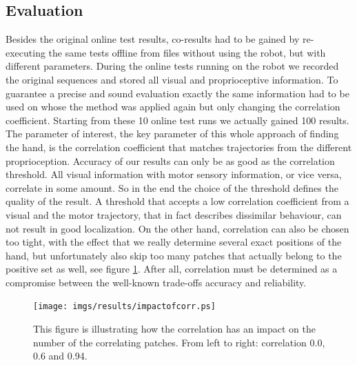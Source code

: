 \documentclass[conference]{IEEEtran}
\begin{document}
%
%
\subsection{Evaluation}\label{results:evaluation}
Besides the original online test results, co-results had to be gained by re-executing the same tests offline from files without using the robot, but with different parameters. During the online tests running on the robot we recorded the original sequences and stored all visual and proprioceptive information. To guarantee a precise and sound evaluation exactly the same information had to be used on whose the method was applied again but only changing the correlation coefficient. Starting from these 10 online test runs we actually gained 100 results. The parameter of interest, the key parameter of this whole approach of finding the hand, is the correlation coefficient that matches trajectories from the different proprioception. Accuracy of our results can only be as good as the correlation threshold. All visual information with motor sensory information, or vice versa, correlate in some amount. So in the end the choice of the threshold defines the quality of the result. A threshold that accepts a low correlation coefficient from a visual and the motor trajectory, that in fact describes dissimilar behaviour, can not result in good localization. On the other hand, correlation can also be chosen too tight, with the effect that we really determine several exact positions of the hand, but unfortunately also skip too many patches that actually belong to the positive set as well, see figure \ref{fig:impactofcorr}. After all, correlation must be determined as a compromise between the well-known trade-offs accuracy and reliability.
%
\begin{figure}
	\begin{center}
		\texttt{[image: imgs/results/impactofcorr.ps]}
			\caption[Varying the correlation threshold.]{ This figure is illustrating how the correlation has an impact on the number of the correlating patches. From left to right: correlation 0.0, 0.6 and 0.94. }
			\label{fig:impactofcorr}
	\end{center}
\end{figure}
%
\end{document}
